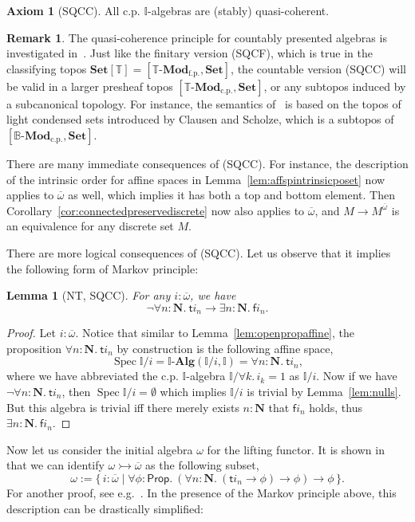 \documentclass[12pt]{amsart}
\newtheorem{lemma}[theorem]{Lemma}
\theoremstyle{definition}
\newtheorem{remark}[theorem]{Remark}
\newtheorem{axiom}{Axiom}
\newcommand{\mb}[1]{\mathbf{#1}}
\newcommand{\mbb}[1]{\mathbb{#1}}
\newcommand{\T}{\mbb T}
\newcommand{\I}{\mbb I}
\newcommand{\mr}[1]{\mathrm{#1}}
\newcommand{\ms}[1]{\mathsf{#1}}
\newcommand{\Set}{\mb{Set}}
\newcommand{\alg}{\text{-}\mb{Alg}}
\newcommand{\ov}[1]{\overline{#1}}
\newcommand{\scomp}[2]{\{\,#1\mid#2\,\}}
\newcommand{\inj}{\rightarrowtail}
\newcommand{\fp}{_{\mr{f.p.}}}
\newcommand{\cp}{_{\mr{c.p.}}}
\newcommand{\N}{\mb N}
\newcommand{\fa}[2]{\forall #1\!\colon\!\!#2.\ }
\newcommand{\ex}[2]{\exists #1\!\colon\!\!#2.\ }
\newcommand{\emp}{\emptyset}
\newcommand{\pp}{\ms{Prop}}
\newcommand{\mmod}[1]{#1\text{-}\mathbf{Mod}}
\newcommand{\spec}{\operatorname{Spec}}
\begin{document}
\begin{axiom}[SQCC]
  All c.p. $\I$-algebras are (stably) quasi-coherent.
\end{axiom}

\begin{remark}
  The quasi-coherence principle for countably presented algebras is investigated in~\cite{cherubini2024foundation}. Just like the finitary version (SQCF), which is true in the classifying topos $\Set[\T] = [\mmod\T\fp,\Set]$, the countable version (SQCC) will be valid in a larger presheaf topos $[\mmod\T\cp,\Set]$, or any subtopos induced by a subcanonical topology. For instance, the semantics of~\cite{cherubini2024foundation} is based on the topos of light condensed sets introduced by Clausen and Scholze, which is a subtopos of $[\mmod{\mbb B}\cp,\Set]$.
\end{remark}

There are many immediate consequences of (SQCC). For instance, the description of the intrinsic order for affine spaces in Lemma~\ref{lem:affspintrinsicposet} now applies to $\ov\omega$ as well, which implies it has both a top and bottom element. Then Corollary~\ref{cor:connectedpreservediscrete} now also applies to $\ov\omega$, and $M \to M^{\ov\omega}$ is an equivalence for any discrete set $M$. 

There are more logical consequences of (SQCC). Let us observe that it implies the following form of Markov principle:

\begin{lemma}[NT, SQCC]\label{lem:markov}
  For any $i : \ov\omega$, we have
  \[ \neg\fa{n}{\N}\ms ti_n \to \ex n\N\ms fi_n. \]
\end{lemma}
\begin{proof}
  Let $i : \ov\omega$. Notice that similar to Lemma~\ref{lem:openpropaffine}, the proposition $\fa n\N \ms ti_n$ by construction is the following affine space, 
  \[ \spec\I/i = \I\alg(\I/i,\I) = \fa n\N \ms ti_n, \]
  where we have abbreviated the c.p. $\I$-algebra $\I/\forall k.\, i_k = 1$ as $\I/i$. Now if we have $\neg\fa n\N \ms ti_n$, then $\spec\I/i = \emp$ which implies $\I/i$ is trivial by Lemma~\ref{lem:nulls}. But this algebra is trivial iff there merely exists $n : \N$ that $\ms fi_n$ holds, thus $\ex n\N \ms fi_n$.
\end{proof}

Now let us consider the initial algebra $\omega$ for the lifting functor. It is shown in~\cite{JIBLADZE1997185} that we can identify $\omega \inj \ov\omega$ as the following subset,
\[ \omega := \scomp{i : \ov\omega}{\fa\phi{\pp} (\fa n{\N} (\ms ti_n \to \phi) \to \phi) \to \phi}. \]
For another proof, see e.g.~\cite{VANOOSTEN2000233}. In the presence of the Markov principle above, this description can be drastically simplified:
\end{document}
